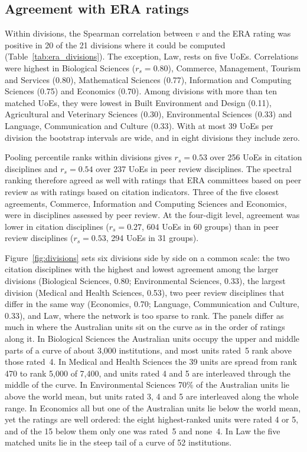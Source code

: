 \subsection{Agreement with ERA ratings}

Within divisions, the Spearman correlation between $v$ and the ERA rating was positive in 20 of the 21 divisions where it could be computed (Table~\ref{tab:era_divisions}). The exception, Law, rests on five UoEs. Correlations were highest in Biological Sciences ($r_s = 0.80$), Commerce, Management, Tourism and Services (0.80), Mathematical Sciences (0.77), Information and Computing Sciences (0.75) and Economics (0.70). Among divisions with more than ten matched UoEs, they were lowest in Built Environment and Design (0.11), Agricultural and Veterinary Sciences (0.30), Environmental Sciences (0.33) and Language, Communication and Culture (0.33). With at most 39 UoEs per division the bootstrap intervals are wide, and in eight divisions they include zero.

Pooling percentile ranks within divisions gives $r_s = 0.53$ over 256 UoEs in citation disciplines and $r_s = 0.54$ over 237 UoEs in peer review disciplines. The spectral ranking therefore agreed as well with ratings that ERA committees based on peer review as with ratings based on citation indicators. Three of the five closest agreements, Commerce, Information and Computing Sciences and Economics, were in disciplines assessed by peer review. At the four-digit level, agreement was lower in citation disciplines ($r_s = 0.27$, 604 UoEs in 60 groups) than in peer review disciplines ($r_s = 0.53$, 294 UoEs in 31 groups).

Figure~\ref{fig:divisions} sets six divisions side by side on a common scale: the two citation disciplines with the highest and lowest agreement among the larger divisions (Biological Sciences, 0.80; Environmental Sciences, 0.33), the largest division (Medical and Health Sciences, 0.53), two peer review disciplines that differ in the same way (Economics, 0.70; Language, Communication and Culture, 0.33), and Law, where the network is too sparse to rank. The panels differ as much in where the Australian units sit on the curve as in the order of ratings along it. In Biological Sciences the Australian units occupy the upper and middle parts of a curve of about 3,000 institutions, and most units rated~5 rank above those rated~4. In Medical and Health Sciences the 39 units are spread from rank 470 to rank 5,000 of 7,400, and units rated 4 and 5 are interleaved through the middle of the curve. In Environmental Sciences 70\% of the Australian units lie above the world mean, but units rated 3, 4 and 5 are interleaved along the whole range. In Economics all but one of the Australian units lie below the world mean, yet the ratings are well ordered: the eight highest-ranked units were rated 4 or 5, and of the 15 below them only one was rated~5 and none~4. In Law the five matched units lie in the steep tail of a curve of 52 institutions.

